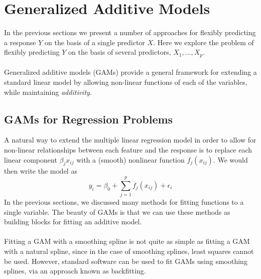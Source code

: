 \section{Generalized Additive Models}
In the previous sections we present a number of approaches for flexibly predicting a response $Y$ on the basis of a single predictor $X$. Here we explore the problem of flexibly predicting $Y$ on the basis of several predictors, $X_1,...,X_p$.\\\\
Generalized additive models (GAMs) provide a general framework for extending a standard linear model by allowing non-linear functions of each of the variables, while maintaining \textit{additivity}.

\subsection{GAMs for Regression Problems}
A natural way to extend the multiple linear regression model in order to allow for non-linear relationships between each feature and the response is to replace each linear component $\beta_jx_{ij}$ with a (smooth) nonlinear function $f_j(x_{ij})$. We would then write the model as
\begin{equation}
    y_i = \beta_0 + \sum_{j=1}^p f_j(x_{ij}) + \epsilon_i
\end{equation}
In the previous sections, we discussed many methods for fitting functions to a single variable. The beauty of GAMs is that we can use these methods as building blocks for fitting an additive model.\\\\
Fitting a GAM with a smoothing spline is not quite as simple as fitting a GAM with a natural spline, since in the case of smoothing splines, least squares cannot be used. However, standard software can be used to fit GAMs using smoothing splines, via an approach known as backfitting.

